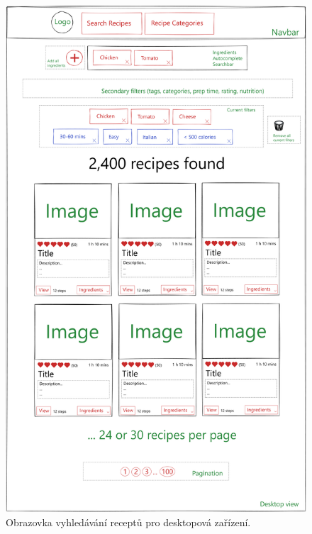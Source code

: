 \begin{figure}[p]\centering
\includegraphics[width=140mm]{../img/desktop-search-view}
\caption{Obrazovka vyhledávání receptů pro desktopová zařízení.}
\label{obr02:desktop-search-view}
\end{figure}

